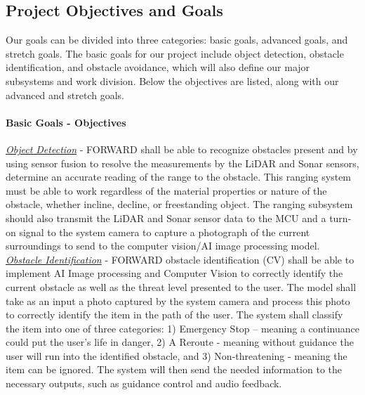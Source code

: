 \subsection{Project Objectives and Goals}
\noindent Our goals can be divided into three categories: basic goals, advanced goals, and stretch goals. The basic goals for our project include object detection, obstacle identification, and obstacle avoidance, which will also define our major subsystems and work division. Below the objectives are listed, along with our advanced and stretch goals. \\

\paragraph{Basic Goals - Objectives} 

\noindent \newline \underline{\textit{Object Detection}} - FORWARD shall be able to recognize obstacles present and by using sensor fusion to resolve the measurements by the LiDAR and Sonar sensors, determine an accurate reading of the range to the obstacle. This ranging system must be able to work regardless of the material properties or nature of the obstacle, whether incline, decline, or freestanding object. The ranging subsystem should also transmit the LiDAR and Sonar sensor data to the MCU and a turn-on signal to the system camera to capture a photograph of the current surroundings to send to the computer vision/AI image processing model. 
\\

\noindent \underline{\textit{Obstacle Identification}} - FORWARD obstacle identification (CV) shall be able to implement AI Image processing and Computer Vision to correctly identify the current obstacle as well as the threat level presented to the user. The model shall take as an input a photo captured by the system camera and process this photo to correctly identify the item in the path of the user. The system shall classify the item into one of three categories: 1) Emergency Stop – meaning a continuance could put the user’s life in danger, 2) A Reroute - meaning without guidance the user will run into the identified obstacle, and 3) Non-threatening - meaning the item can be ignored. The system will then send the needed information to the necessary outputs, such as guidance control and audio feedback. \\

